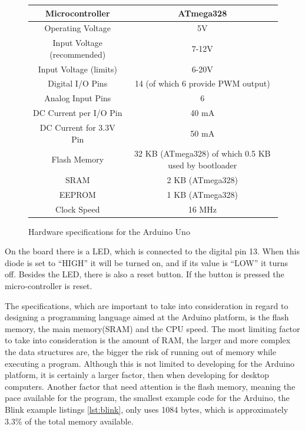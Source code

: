 \begin{figure}[H]
\centering
\begin{tabular}{|c|c|}
\hline 
Microcontroller & ATmega328 \\ 
\hline 
Operating Voltage & 5V \\ 
\hline 
Input Voltage (recommended)	 & 7-12V \\ 
\hline 
Input Voltage (limits) & 6-20V \\ 
\hline 
Digital I/O Pins & 14 (of which 6 provide PWM output) \\ 
\hline 
Analog Input Pins & 6 \\ 
\hline 
DC Current per I/O Pin & 40 mA \\ 
\hline 
DC Current for 3.3V Pin & 50 mA \\ 
\hline 
Flash Memory & 32 KB (ATmega328) of which 0.5 KB used by bootloader \\ 
\hline 
SRAM & 2 KB (ATmega328) \\ 
\hline 
EEPROM & 1 KB (ATmega328) \\ 
\hline 
Clock Speed & 16 MHz \\ 
\hline 
\end{tabular} 
\caption{Hardware specifications for the Arduino Uno}
\end{figure}

On the board there is a LED, which is connected to the digital pin 13. When this diode is set to ``HIGH'' it will be turned on, and if its value is ``LOW'' it turns off. Besides the LED, there is also a reset button. If the button is pressed the micro-controller is reset. 

The specifications, which are important to take into consideration in regard to designing a programming language aimed at the Arduino platform, is the flash memory, the main memory(SRAM) and the CPU speed. The most limiting factor to take into consideration is the amount of RAM, the larger and more complex the data structures are, the bigger the risk of running out of memory while executing a program. Although this is not limited to developing for the Arduino platform, it is certainly a larger factor, then when developing for desktop computers.
Another factor that need attention is the flash memory, meaning the pace available for the program, the smallest example code for the Arduino, the Blink example listings \ref{lst:blink}, only uses 1084 bytes, which is approximately $3.3 \%$ of the total memory available. 

